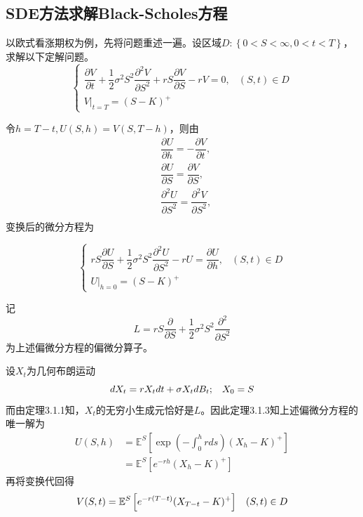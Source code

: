 \documentclass[UTF8，12pt]{ctexart}
\numberwithin{equation}{section}
\begin{document}
\subsection{SDE方法求解Black-Scholes方程}

以欧式看涨期权为例，先将问题重述一遍。设区域$D:\left\{0<S<\infty,0<t<T\right\}$，求解以下定解问题。
\[
\begin{cases}
	\dfrac{\partial V}{\partial t} + \dfrac{1}{2}\sigma^2 S^2 \dfrac{\partial^2 V}{\partial S^2} + rS \dfrac{\partial V}{\partial S} - rV = 0, & (S,t)\in D \\[10pt]
	V|_{t=T} = (S - K)^+
\end{cases}
\]

令$h=T-t,U(S,h)=V(S,T-h)$，则由
\begin{equation}
	\begin{split}
		&\dfrac{\partial U}{\partial h}=-\dfrac{\partial V}{\partial t},\\
		&\dfrac{\partial U}{\partial S}=\dfrac{\partial V}{\partial S},\\
		&\dfrac{\partial^2 U}{\partial S^2}=\dfrac{\partial^2 V}{\partial S^2},\\
	\end{split}
\end{equation}
变换后的微分方程为

\[
\begin{cases}
	rS\dfrac{\partial U}{\partial S}+\dfrac{1}{2}\sigma^2 S^2\dfrac{\partial^2 U}{\partial S^2}-rU=\dfrac{\partial U}{\partial h}, & (S,t)\in D \\[10pt]
	U|_{h=0} = (S - K)^+
\end{cases}
\]

记
\begin{equation}
	L=rS\dfrac{\partial}{\partial S}+\dfrac{1}{2}\sigma^2 S^2\dfrac{\partial^2}{\partial S^2}
\end{equation}
为上述偏微分方程的偏微分算子。

设$X_t$为几何布朗运动
\begin{equation}
	dX_t=rX_tdt+\sigma X_tdB_t;\hspace{0.3cm}X_0=S
\end{equation}
而由定理3.1.1知，$X_t$的无穷小生成元恰好是$L$。因此定理3.1.3知上述偏微分方程的唯一解为
\begin{equation}
	\begin{split}
		U(S,h)&=\mathbb{E}^S\left[\exp(-\int_{0}^{h}rds)(X_h-K)^+\right]\\
			  &=\mathbb{E}^S\left[e^{-rh}(X_h-K)^+\right]
	\end{split}
\end{equation}
再将变换代回得
\begin{equation}
	V(S,t)=\mathbb{E}^S\left[e^{-r(T-t)}(X_{T-t}-K)^+\right]\hspace{0.3cm}(S,t)\in D
\end{equation}
\end{document}
